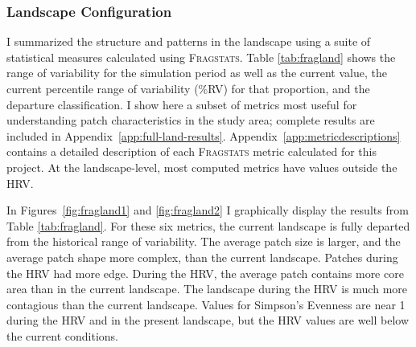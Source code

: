 \clearpage



\subsubsection*{Landscape Configuration}
I summarized the structure and patterns in the landscape using a suite of statistical measures calculated using \textsc{Fragstats}. Table \ref{tab:fragland} shows the range of variability for the simulation period as well as the current value, the current percentile range of variability (\%RV) for that proportion, and the departure classification. I show here a subset of metrics most useful for understanding patch characteristics in the study area; complete results are included in Appendix~\ref{app:full-land-results}.  Appendix~\ref{app:metricdescriptions} contains a detailed description of each \textsc{Fragstats} metric calculated for this project. At the landscape-level, most computed metrics have values outside the HRV. 

In Figures~\ref{fig:fragland1} and \ref{fig:fragland2} I graphically display the results from Table \ref{tab:fragland}. For these six metrics, the current landscape is fully departed from the historical range of variability. The average patch size is larger, and the average patch shape more complex, than the current landscape. Patches during the HRV had more edge. During the HRV, the average patch contains more core area than in the current landscape. The landscape during the HRV is much more contagious than the current landscape. Values for Simpson's Evenness are near 1 during the HRV and in the present landscape, but the HRV values are well below the current conditions.


